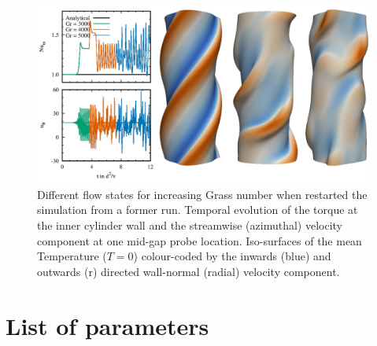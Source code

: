 \documentclass[a4paper, 11pt, DIV=11]{scrartcl}
\begin{document}
\begin{figure}[htb]
\centering
\includegraphics[width=1.00\textwidth]{figures/tc0073/compareGrasshof.png}
\caption{Different flow states for increasing Grass number when restarted
the simulation from a former run. Temporal evolution of the torque at the inner
cylinder wall and the streamwise (azimuthal) velocity component at one mid-gap
probe location. Iso-surfaces of the mean Temperature ($T=0$) colour-coded by the
inwards (blue) and outwards (r) directed wall-normal (radial) velocity component.}
\label{fig:compareGrass}
\end{figure}





\appendix



\section{List of parameters}
\label{sec:listOfParameters}
\end{document}
